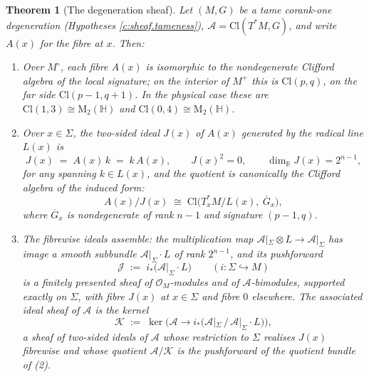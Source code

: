 \documentclass[11pt]{article}
\newtheorem{theorem}{Theorem}[section]
\theoremstyle{definition}
\theoremstyle{plain}
\newcommand{\changedmark}[2]{\marginpar{\raggedright\scriptsize\color{#1}#2}}
\providecommand{\Cl}{}\renewcommand{\Cl}{\mathrm{Cl}}
\providecommand{\HH}{}\renewcommand{\HH}{\mathbb{H}}
\providecommand{\Mat}{}\renewcommand{\Mat}{\mathrm{M}}
\providecommand{\Mo}{}\renewcommand{\Mo}{M^{\circ}}
\providecommand{\Mp}{}\renewcommand{\Mp}{M^{+}}
\providecommand{\R}{}\renewcommand{\R}{\mathbb{R}}
\providecommand{\Sig}{}\renewcommand{\Sig}{\Sigma}
\providecommand{\shA}{}\renewcommand{\shA}{\mathcal{A}}
\providecommand{\shJ}{}\renewcommand{\shJ}{\mathcal{J}}
\providecommand{\shK}{}\renewcommand{\shK}{\mathcal{K}}
\providecommand{\shL}{}\renewcommand{\shL}{L}
\begin{document}
\begin{theorem}[The degeneration sheaf]\label{c:sheaf.degeneration-sheaf}
\changedmark{gray}{reworded}
Let $(M, G)$ be a tame corank-one degeneration (Hypotheses \ref{c:sheaf.tameness}), $\shA = \Cl(T^*M, G)$, and write $A(x)$ for the fibre at $x$. Then:
\begin{enumerate}
\item Over $\Mo$, each fibre $A(x)$ is isomorphic to the nondegenerate Clifford algebra of the local signature; on the interior of $\Mp$ this is $\Cl(p,q)$, on the far side $\Cl(p{-}1,q{+}1)$. In the physical case these are $\Cl(1,3) \cong \Mat_2(\HH)$ and $\Cl(0,4) \cong \Mat_2(\HH)$.
\item Over $x \in \Sig$, the two-sided ideal $J(x)$ of $A(x)$ generated by the radical line $\shL(x)$ is
\[
J(x) \;=\; A(x)\,k \;=\; k\,A(x), \qquad J(x)^2 = 0, \qquad \dim_\R J(x) = 2^{n-1},
\]
for any spanning $k \in \shL(x)$, and the quotient is canonically the Clifford algebra of the induced form:
\[
A(x)/J(x) \;\cong\; \Cl\bigl(T^*_xM / \shL(x),\ \overline{G}_x\bigr),
\]
where $\overline{G}_x$ is nondegenerate of rank $n-1$ and signature $(p{-}1, q)$.
\item The fibrewise ideals assemble: the multiplication map $\shA|_\Sig \otimes \shL \to \shA|_\Sig$ has image a smooth subbundle $\shA|_\Sig \cdot \shL$ of rank $2^{n-1}$, and its pushforward
\[
\shJ \;:=\; i_*\bigl(\shA|_\Sig \cdot \shL\bigr) \qquad (i : \Sig \hookrightarrow M)
\]
is a finitely presented sheaf of $\mathcal{O}_M$-modules and of $\shA$-bimodules, supported exactly on $\Sig$, with fibre $J(x)$ at $x \in \Sig$ and fibre $0$ elsewhere. The associated ideal sheaf of $\shA$ is the kernel
\[
\shK \;:=\; \ker\bigl(\shA \longrightarrow i_*\bigl(\shA|_\Sig \,/\, \shA|_\Sig \cdot \shL\bigr)\bigr),
\]
a sheaf of two-sided ideals of $\shA$ whose restriction to $\Sig$ realises $J(x)$ fibrewise and whose quotient $\shA/\shK$ is the pushforward of the quotient bundle of (2).
\end{enumerate}
\end{theorem}
\end{document}
